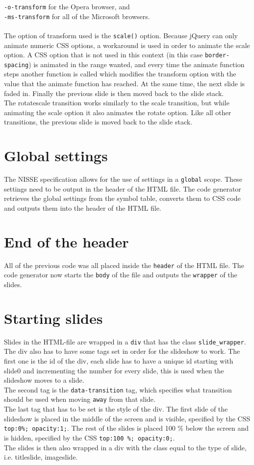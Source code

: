 \texttt{-o-transform} for the Opera browser, and \\
\texttt{-ms-transform} for all of the Microsoft browsers. \\ \\
The option of transform used is the \texttt{scale()} option. Because jQuery can only animate numeric CSS options, a workaround is used in order to animate the scale option. A CSS option that is not used in this context (in this case \texttt{border-spacing}) is animated in the range wanted, and every time the animate function steps another function is called which modifies the transform option with the value that the animate function has reached. At the same time, the next slide is faded in. Finally the previous slide is then moved back to the slide stack. \\
The rotatescale transition works similarly to the scale transition, but while animating the scale option it also animates the rotate option. Like all other transitions, the previous slide is moved back to the slide stack.

\section{Global settings}
The NISSE specification allows for the use of settings in a \texttt{global} scope. These settings need to be output in the header of the HTML file. The code generator retrieves the global settings from the symbol table, converts them to CSS code and outputs them into the header of the HTML file.

\section{End of the header}
All of the previous code was all placed inside the \texttt{header} of the HTML file. The code generator now starts the \texttt{body} of the file and outputs the \texttt{wrapper} of the slides.

\section{Starting slides}
Slides in the HTML-file are wrapped in a \texttt{div} that has the class \texttt{slide\_wrapper}. The div also has to have some tags set in order for the slideshow to work. The first one is the id of the div, each slide has to have a unique id starting with slide0 and incrementing the number for every slide, this is used when the slideshow moves to a slide. \\
The second tag is the \texttt{data-transition} tag, which specifies what transition should be used when moving \texttt{away} from that slide. \\
The last tag that has to be set is the style of the div. The first slide of the slideshow is placed in the middle of the screen and is visible, specified by the CSS \texttt{top:0\%; opacity:1;}. The rest of the slides is placed 100 \% below the screen and is hidden, specified by the CSS \texttt{top:100 \%; opacity:0;}. \\
The slides is then also wrapped in a div with the class equal to the type of slide, i.e. titleslide, imageslide.

